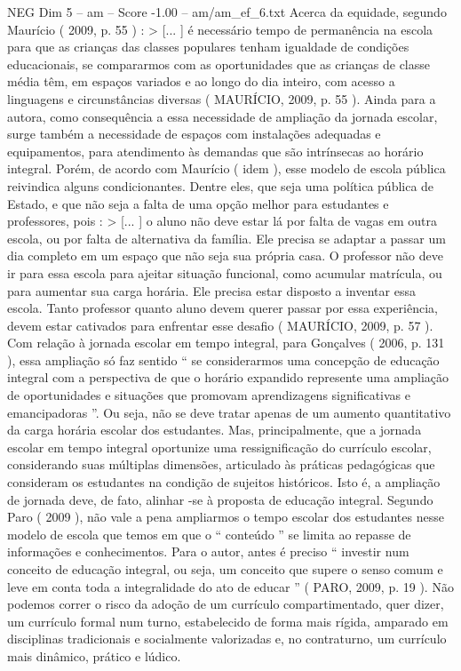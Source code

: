\begin{textsample}{NEG Dim 5 – am – Score -1.00 – am/am\_ef\_6.txt}
Acerca da equidade, segundo Maurício ( 2009, p. 55 ) : > [... ] é necessário tempo de permanência na escola para que as crianças das classes populares tenham igualdade de condições educacionais, se compararmos com as oportunidades que as crianças de classe média têm, em espaços variados e ao longo do dia inteiro, com acesso a linguagens e circunstâncias diversas ( MAURÍCIO, 2009, p. 55 ).
Ainda para a autora, como consequência a essa necessidade de ampliação da jornada escolar, surge também a necessidade de espaços com instalações adequadas e equipamentos, para atendimento às demandas que são intrínsecas ao horário integral.
Porém, de acordo com Maurício ( idem ), esse modelo de escola pública reivindica alguns condicionantes.
Dentre eles, que seja uma política pública de Estado, e que não seja a falta de uma opção melhor para estudantes e professores, pois : > [... ] o aluno não deve estar lá por falta de vagas em outra escola, ou por falta de alternativa da família.
Ele precisa se adaptar a passar um dia completo em um espaço que não seja sua própria casa.
O professor não deve ir para essa escola para ajeitar situação funcional, como acumular matrícula, ou para aumentar sua carga horária.
Ele precisa estar disposto a inventar essa escola.
Tanto professor quanto aluno devem querer passar por essa experiência, devem estar cativados para enfrentar esse desafio ( MAURÍCIO, 2009, p. 57 ).
Com relação à jornada escolar em tempo integral, para Gonçalves ( 2006, p. 131 ), essa ampliação só faz sentido “ se considerarmos uma concepção de educação integral com a perspectiva de que o horário expandido represente uma ampliação de oportunidades e situações que promovam aprendizagens significativas e emancipadoras ”.
Ou seja, não se deve tratar apenas de um aumento quantitativo da carga horária escolar dos estudantes.
Mas, principalmente, que a jornada escolar em tempo integral oportunize uma ressignificação do currículo escolar, considerando suas múltiplas dimensões, articulado às práticas pedagógicas que consideram os estudantes na condição de sujeitos históricos.
Isto é, a ampliação de jornada deve, de fato, alinhar -se à proposta de educação integral.
Segundo Paro ( 2009 ), não vale a pena ampliarmos o tempo escolar dos estudantes nesse modelo de escola que temos em que o “ conteúdo ” se limita ao repasse de informações e conhecimentos.
Para o autor, antes é preciso “ investir num conceito de educação integral, ou seja, um conceito que supere o senso comum e leve em conta toda a integralidade do ato de educar ” ( PARO, 2009, p. 19 ).
Não podemos correr o risco da adoção de um currículo compartimentado, quer dizer, um currículo formal num turno, estabelecido de forma mais rígida, amparado em disciplinas tradicionais e socialmente valorizadas e, no contraturno, um currículo mais dinâmico, prático e lúdico.

\end{textsample}
